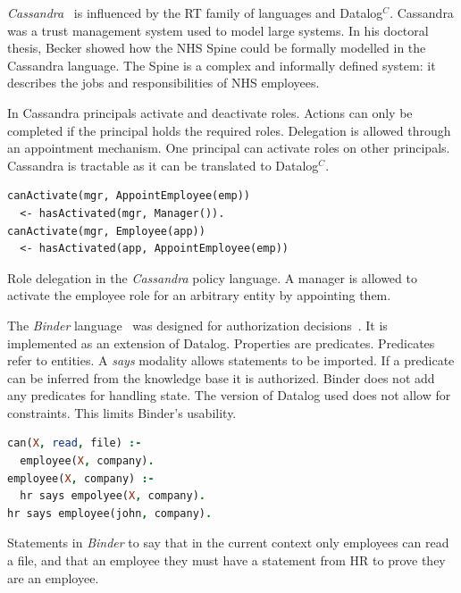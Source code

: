 \documentclass[a4paper]{article}
\begin{document}
\emph{Cassandra}~\cite{Becker:2004fi} is influenced by the RT family of
languages and Datalog$^C$.  Cassandra was a trust management system used to
model large systems.  In his doctoral thesis, Becker showed how the NHS Spine
could be formally modelled in the Cassandra language.  The Spine is a complex
and informally defined system: it describes the jobs and responsibilities of NHS
employees.

In Cassandra principals activate and deactivate roles. Actions can only be completed if the
principal holds the required roles. Delegation is allowed through an
appointment mechanism. One principal can activate roles on other
principals. Cassandra is tractable as it can be translated
to Datalog$^C$.

\begin{marginfigure}
  \begin{lstlisting}[language=Cassandra]
canActivate(mgr, AppointEmployee(emp))
  <- hasActivated(mgr, Manager()).
canActivate(mgr, Employee(app))
  <- hasActivated(app, AppointEmployee(emp))
  \end{lstlisting}
  \caption{Role delegation in the \emph{Cassandra} policy language. A manager is
  allowed to activate the employee role for an arbitrary entity by appointing
  them.}
\label{code:cassandra}
\end{marginfigure}

The \emph{Binder} language~\cite{DeTreville:2002ff} was designed for
authorization decisions~\cite{Abadi:2003kt}.  It is implemented as an extension
of Datalog.  Properties are predicates. Predicates refer to entities.  A
\emph{says} modality allows statements to be imported.  If a predicate can be
inferred from the knowledge base it is authorized.  Binder does not add any
predicates for handling state.  The version of Datalog used does not allow for
constraints.  This limits Binder's usability.

\begin{marginfigure}
  \begin{lstlisting}[language=Prolog,morekeywords={*,says,:-}]
can(X, read, file) :- 
  employee(X, company).
employee(X, company) :- 
  hr says empolyee(X, company).
hr says employee(john, company).
  \end{lstlisting}
  \caption{Statements in \emph{Binder} to say that in the current context only
    employees can read a file, and that an employee they must have a statement
    from HR to prove they are an employee.}
\label{code:binder}
\end{marginfigure}
\end{document}
